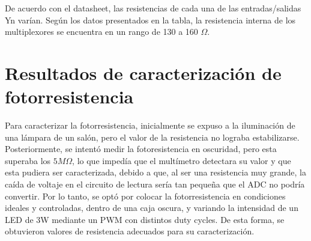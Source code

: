                
            \begin{table}[htbp]
                \caption{Resistencia de multiplexores.}
                \begin{center}
                \label{tab:Mux_res}
                \end{center}
            \end{table}

De acuerdo con el datasheet, las resistencias de cada una de las entradas/salidas Yn varían. Según los datos presentados en la tabla, la resistencia interna de los multiplexores se encuentra en un rango de 130 a 160 $\Omega$. 
 
                     
\section{Resultados de caracterización de fotorresistencia}
Para caracterizar la fotorresistencia, inicialmente se expuso a la iluminación de una lámpara de un salón, pero el valor de la resistencia no lograba estabilizarse. Posteriormente, se intentó medir la fotoresistencia en oscuridad, pero esta superaba los $5M\Omega$, lo que impedía que el multímetro detectara su valor y que esta pudiera ser caracterizada, debido a que, al ser una resistencia muy grande, la caída de voltaje en el circuito de lectura sería tan pequeña que el ADC no podría convertir. Por lo tanto, se optó por colocar la fotorresistencia en condiciones ideales y controladas, dentro de una caja oscura, y variando la intensidad de un LED de 3W mediante un PWM con distintos duty cycles. De esta forma, se obtuvieron valores de resistencia adecuados para su caracterización.

